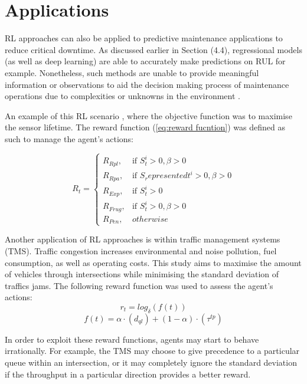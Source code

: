 \section{Applications}
RL approaches can also be applied to predictive maintenance applications to reduce critical downtime. 
As discussed earlier in Section (4.4), regressional models (as well as deep learning) are able to accurately make predictions on RUL for example. 
Nonetheless, such methods are unable to provide meaningful information or observations to aid the decision making process of maintenance operations due to complexities or unknowns in the environment \cite{9221098}.

An example of this RL scenario \cite{9221098}, where the objective function was to maximise the sensor lifetime.
The reward function (\ref{eq:reward fucntion}) was defined as such to manage the agent's actions:

\begin{equation}
    \label{eq:reward fucntion}
    R_t = \begin{cases}
        R_{Rpl}, & \text{if } S_t^i > 0, \beta > 0\\
        R_{Rpa}, & \text{if } S_representedt^i > 0, \beta > 0\\
        R_{Exp}, & \text{if } S_t^i > 0\\
        R_{Frug}, & \text{if } S_t^i > 0, \beta > 0\\
        R_{Pen}, & otherwise
    \end{cases}
\end{equation}

Another application of RL approaches is within traffic management systems (TMS). 
Traffic congestion increases environmental and noise pollution, fuel consumption, as well as operating costs.
This study \cite{JOO2020324} aims to maximise the amount of vehicles through intersections while minimising the standard deviation of traffics jams.
The following reward function was used to assess the agent's actions:
\begin{equation}
    r_t = log_\delta(f(t))
\end{equation}
\begin{equation}
    f(t) = \alpha \cdot (d_{ql}) + (1 - \alpha)\cdot(\tau^{tp})
\end{equation}

In order to exploit these reward functions, agents may start to behave irrationally. 
For example, the TMS may choose to give precedence to a particular queue within an intersection, or it may completely ignore the standard deviation if the throughput in a particular direction provides a better reward.

